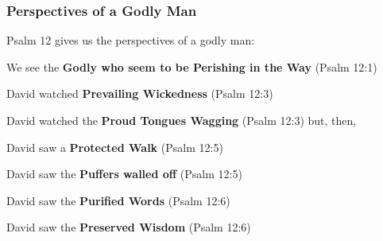 \subsubsection{Perspectives of a Godly Man}
Psalm 12 gives us the perspectives of a godly man:
\begin{compactenum}[I.]
    \item We see the \textbf{Godly who seem to be Perishing in the Way}  (Psalm 12:1)
    \begin{compactenum}[A.]
    	\item David watched \textbf{Prevailing Wickedness}  (Psalm 12:3)
		\item David watched the \textbf{Proud Tongues Wagging}  (Psalm 12:3) \newline but, then, 
    \end{compactenum}	
    \item David saw a \textbf{Protected Walk}  (Psalm 12:5)
	\begin{compactenum}[A.]
    \item David saw the \textbf{Puffers walled off}  (Psalm 12:5)
    \item David saw the \textbf{Purified Words}  (Psalm 12:6)
    \item David saw the \textbf{Preserved Wisdom}  (Psalm 12:6)
    \end{compactenum}
\end{compactenum}





